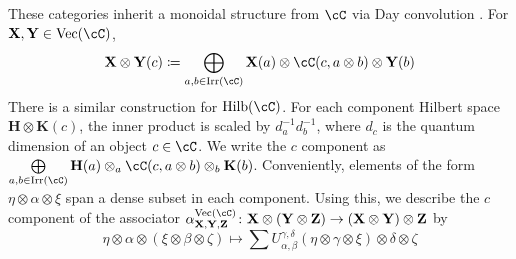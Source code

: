 \documentclass[11pt,reqno]{amsart}
\DeclareMathOperator{\Irr}{Irr}
\DeclareMathOperator{\Vect}{Vec}
\DeclareMathOperator{\Hilb}{Hilb}
\newcommand{\bb}[1]{\mathbf{#1}}
\numberwithin{equation}{section}
\theoremstyle{plain}
\begin{document}
These categories inherit a monoidal structure from $\cC$ via Day convolution \cite{Day70}.
For $\bb X, \bb Y \in \Vect(\cC)$, $$\bb X \otimes \bb Y(c) \coloneq \bigoplus \limits_{a, b \in \Irr(\cC)} \bb X(a) \otimes \cC(c, a \otimes b) \otimes \bb Y(b)$$
There is a similar construction for $\Hilb(\cC)$.
For each component Hilbert space $\bb H \otimes \bb K(c)$, the inner product is scaled by $d_a^{-1} d_b^{-1}$, where $d_c$ is the quantum dimension of an object $c \in \cC$.
We write the $c$ component as $\bigoplus \limits_{a, b \in \Irr(\cC)}\bb H(a) \otimes_a \cC(c, a \otimes b) \otimes_b \bb K(b)$.
Conveniently, elements of the form $\eta \otimes \alpha \otimes \xi$ span a dense subset in each component.
Using this, we describe the $c$ component of the associator $\alpha^{\Vect(\cC)}_{\bb X, \bb Y, \bb Z} \colon \bb X \otimes (\bb Y \otimes \bb Z) \to (\bb X \otimes \bb Y) \otimes \bb Z$ by
$$\eta \otimes \alpha \otimes (\xi \otimes \beta \otimes \zeta) \mapsto \sum U^{\gamma, \delta}_{\alpha, \beta} (\eta \otimes \gamma \otimes \xi) \otimes \delta \otimes \zeta$$
\end{document}
